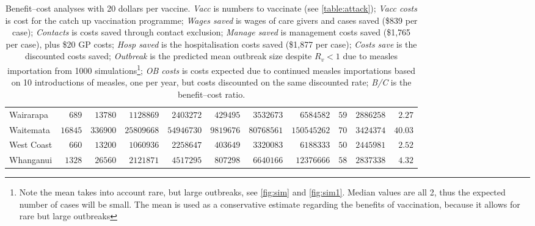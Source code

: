 \documentclass{article}
\begin{document}
\begin{table}
\begin{center}
\begin{tabular}{lrrrrrrrrrr}
Wairarapa&$  689$&$ 13780$&$ 1128869$&$ 2403272$&$  429495$&$ 3532673$&$  6584582$&$ 59$&$2886258$&$ 2.27$\tabularnewline
Waitemata&$16845$&$336900$&$25809668$&$54946730$&$ 9819676$&$80768561$&$150545262$&$ 70$&$3424374$&$40.03$\tabularnewline
West Coast&$  660$&$ 13200$&$ 1060936$&$ 2258647$&$  403649$&$ 3320083$&$  6188333$&$ 50$&$2445981$&$ 2.52$\tabularnewline
Whanganui&$ 1328$&$ 26560$&$ 2121871$&$ 4517295$&$  807298$&$ 6640166$&$ 12376666$&$ 58$&$2837338$&$ 4.32$\tabularnewline
\hline
\end{tabular}\end{center}\caption{Benefit--cost analyses with 20 dollars per vaccine. \textit{Vacc} is numbers to vaccinate (see \autoref{table:attack}); \textit{Vacc costs} is cost for the catch up vaccination programme; \textit{Wages saved} is wages of care givers and cases saved (\$839 per case); \textit{Contacts} is costs saved through contact exclusion; \textit{Manage saved} is management costs saved (\$1,765 per case), plus \$20 GP costs; \textit{Hosp saved} is the hospitalisation costs saved (\$1,877 per case); \textit{Costs save}  is the discounted costs saved; \textit{Outbreak}	is the predicted mean outbreak size despite $R_v < 1$ due to measles importation from 1000 simulations\footnote{Note the mean takes into account rare, but large outbreaks, see \autoref{fig:sim} and \autoref{fig:sim1}. Median values are all 2, thus the expected number of cases will be small. The mean is used as a conservative estimate regarding the benefits of vaccination, because it allows for rare but large outbreaks}; \textit{OB costs}	is costs expected due to continued measles importations based on 10 introductions of measles, one per year, but costs discounted on the same discounted rate; \textit{B/C} is the benefit--cost ratio.}
\label{table:cost20}
\end{table}
\end{document}

